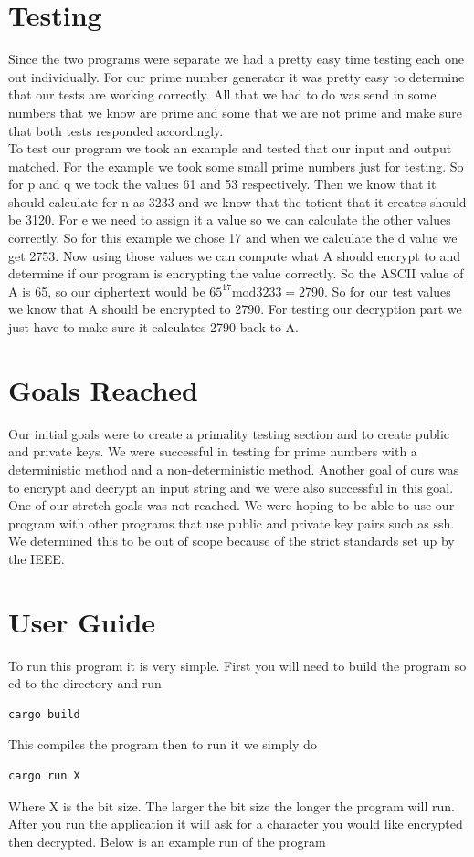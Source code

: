 \documentclass[12pt,journal,compsoc]{IEEEtran}
\begin{document}
\section{Testing}
Since the two programs were separate we had a pretty easy time testing each one out individually. 
For our prime number generator it was pretty easy to determine that our tests are working correctly. All that we had to do was send in some numbers that we know are prime and some that we are not prime and make sure that both tests responded accordingly. \\ \indent
To test our program we took an example and tested that our input and output matched. For the example we took some small prime numbers just for testing. So for p and q we took the values 61 and 53 respectively. Then we know that it should calculate for n as 3233 and we know that the totient that it creates should be 3120. For e we need to assign it a value so we can calculate the other values correctly. So for this example we chose 17 and when we calculate the d value we get 2753. \newline \indent
Now using those values we can compute what A should encrypt to and determine if our program is encrypting the value correctly. So the ASCII value of A is 65, so our ciphertext would be ${65}^{17}\mathrm{mod}3233=2790$. So for our test values we know that A should be encrypted to 2790. For testing our decryption part we just have to make sure it calculates 2790 back to A.

\section{Goals Reached}
Our initial goals were to create a primality testing section and to create public and private keys. We were successful in testing for prime numbers with a deterministic method and a non-deterministic method. Another goal of ours was to encrypt and decrypt an input string and we were also successful in this goal. \\ \indent One of our stretch goals was not reached. We were hoping to be able to use our program with other programs that use public and private key pairs such as ssh. We determined this to be out of scope because of the strict standards set up by the IEEE. 

\section{User Guide}
To run this program it is very simple. First you will need to build the program so cd to the directory and run 
\begin{lstlisting}[frame=single]
cargo build
\end{lstlisting} 
This compiles the program then to run it we simply do 
\begin{lstlisting}[frame=single]
cargo run X 
\end{lstlisting}
Where X is the bit size. The larger the bit size the longer the program will run. After you run the application it will ask for a character you would like encrypted then decrypted. Below is an example run of the program\newline
\end{document}
